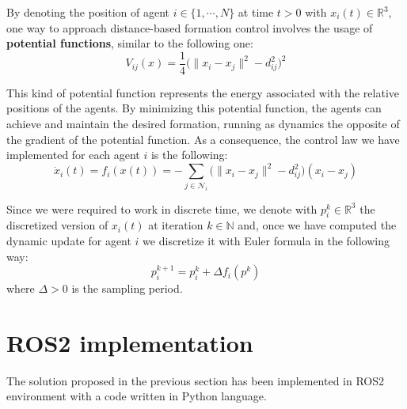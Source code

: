 \documentclass[a4paper,11pt,oneside]{book}
\begin{document}
By denoting the position of agent $i \in \{1, \cdots, N\}$ at time $t>0$ with $x_i(t) \in \mathbb{R}^3$, one way to approach distance-based formation control involves the usage of \textbf{potential functions}, similar to the following one:
\begin{equation}
V_{ij}(x)  = \frac{1}{4} \bigg( \lVert x_i - x_j \rVert^2 - d_{ij}^2 \bigg)^2
\label{Formation_potential}
\end{equation}

This kind of potential function represents the energy associated with the relative positions of the agents. By minimizing this potential function, the agents can achieve and maintain the desired formation, running as dynamics the opposite of the gradient of the potential function.
As a consequence, the control law we have implemented for each agent $i$ is the following:
\begin{equation}
\dot{x}_i(t) = f_i(x(t)) = - \sum_{j \in \mathcal{N}_i} \bigg( \lVert x_i - x_j \rVert^2 - d_{ij}^2 \bigg) (x_i - x_j )
\label{Dynamics_no_collision_avoidance}
\end{equation}

Since we were required to work in discrete time, we denote with $p_i^k \in \mathbb{R}^3$ the discretized version of $x_i(t)$ at iteration $k \in \mathbb{N}$ and, once we have computed the dynamic update for agent $i$ we discretize it with Euler formula in the following way:
\begin{equation}
p_i^{k+1} = p_i^{k} + \Delta f_i(p^k)
\end{equation}
where $\Delta > 0$ is the sampling period.

\section{ROS2 implementation}
The solution proposed in the previous section has been implemented in ROS2 environment with a code written in Python language.
\end{document}
